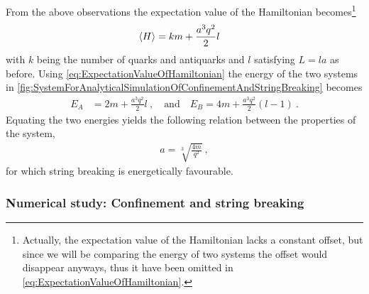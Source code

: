 \documentclass[../main.tex]{subfiles} %
\begin{document}
From the above observations the expectation value of the Hamiltonian becomes\footnote{Actually, the expectation value of the Hamiltonian lacks a constant offset, but since we will be comparing the energy of two systems the offset would disappear anyways, thus it have been omitted in \cref{eq:ExpectationValueOfHamiltonian}.}
\begin{align} \label{eq:ExpectationValueOfHamiltonian}
    \expval{H} &= km + \frac{a^3 q^2}{2}l
\end{align}
with $k$ being the number of quarks and antiquarks and $l$ satisfying $L=la$ as before. Using \cref{eq:ExpectationValueOfHamiltonian} the energy of the two systems in \cref{fig:SystemForAnalyticalSimulationOfConfinementAndStringBreaking} becomes
\begin{align}
    E_A &= 2m + \frac{a^3 q^2}{2}l \: ,
    \quad \text{and} \quad
    E_B = 4m + \frac{a^3 q^2}{2}(l-1) \: .
\end{align}
Equating the two energies yields the following relation between the properties of the system,
\begin{align} \label{eq:StringBreakingFavourableValues}
    a = \sqrt[3\:\:\,]{\frac{4m}{q^2}} \: ,
\end{align}
for which string breaking is energetically favourable.



\subsubsection{Numerical study: Confinement and string breaking}
\end{document}
